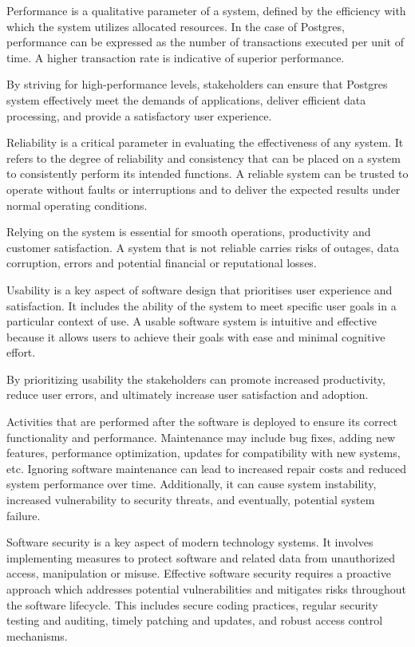 Performance is a qualitative parameter of a system, defined by the efficiency with which the system utilizes allocated resources. In the case of Postgres, performance can be expressed as the number of transactions executed per unit of time. A higher transaction rate is indicative of superior performance.

By striving for high-performance levels, stakeholders can ensure that Postgres system effectively meet the demands of applications, deliver efficient data processing, and provide a satisfactory user experience.

Reliability is a critical parameter in evaluating the effectiveness of any system. It refers to the degree of reliability and consistency that can be placed on a system to consistently perform its intended functions. A reliable system can be trusted to operate without faults or interruptions and to deliver the expected results under normal operating conditions.

Relying on the system is essential for smooth operations, productivity and customer satisfaction. A system that is not reliable carries risks of outages, data corruption, errors and potential financial or reputational losses.

Usability is a key aspect of software design that prioritises user experience and satisfaction. It includes the ability of the system to meet specific user goals in a particular context of use. A usable software system is intuitive and effective because it allows users to achieve their goals with ease and minimal cognitive effort.

By prioritizing usability the stakeholders can promote increased productivity, reduce user errors, and ultimately increase user satisfaction and adoption.

Activities that are performed after the software is deployed to ensure its correct functionality and performance. Maintenance may include bug fixes, adding new features, performance optimization, updates for compatibility with new systems, etc. Ignoring software maintenance can lead to increased repair costs and reduced system performance over time. Additionally, it can cause system instability, increased vulnerability to security threats, and eventually, potential system failure.

Software security is a key aspect of modern technology systems. It involves implementing measures to protect software and related data from unauthorized access, manipulation or misuse.
Effective software security requires a proactive approach which addresses potential vulnerabilities and mitigates risks throughout the software lifecycle. This includes secure coding practices, regular security testing and auditing, timely patching and updates, and robust access control mechanisms.

